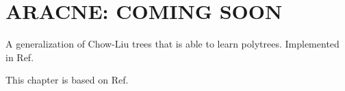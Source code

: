 \chapter{ARACNE: COMING SOON}
\label{ch-aracne}

A generalization
of Chow-Liu trees
that is able to learn 
polytrees. Implemented 
in \bnlearn Ref.\cite{bnlearn}

This chapter
is based on
Ref.\cite{aracne}




